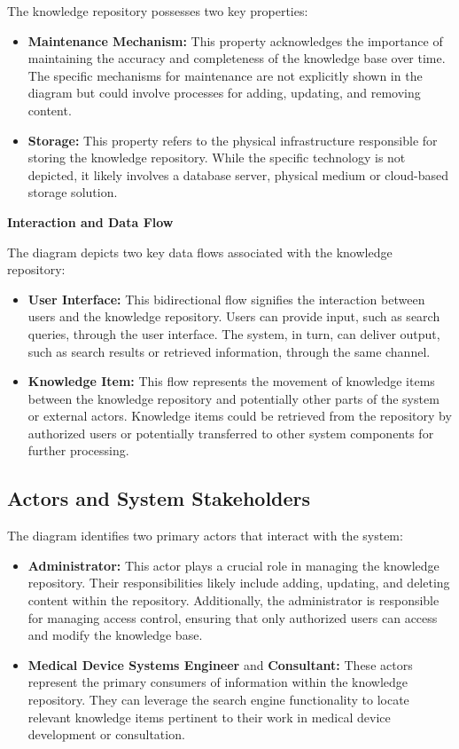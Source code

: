 \documentclass[
  letterpaper,
  DIV=11,
  numbers=noendperiod]{scrreprt}
\begin{document}
The knowledge repository possesses two key properties:

\begin{itemize}
\item
  \textbf{Maintenance Mechanism:} This property acknowledges the
  importance of maintaining the accuracy and completeness of the
  knowledge base over time. The specific mechanisms for maintenance are
  not explicitly shown in the diagram but could involve processes for
  adding, updating, and removing content.
\item
  \textbf{Storage:} This property refers to the physical infrastructure
  responsible for storing the knowledge repository. While the specific
  technology is not depicted, it likely involves a database server,
  physical medium or cloud-based storage solution.
\end{itemize}

\textbf{Interaction and Data Flow}

The diagram depicts two key data flows associated with the knowledge
repository:

\begin{itemize}
\item
  \textbf{User Interface:} This bidirectional flow signifies the
  interaction between users and the knowledge repository. Users can
  provide input, such as search queries, through the user interface. The
  system, in turn, can deliver output, such as search results or
  retrieved information, through the same channel.
\item
  \textbf{Knowledge Item:} This flow represents the movement of
  knowledge items between the knowledge repository and potentially other
  parts of the system or external actors. Knowledge items could be
  retrieved from the repository by authorized users or potentially
  transferred to other system components for further processing.
\end{itemize}

\subsection{Actors and System
Stakeholders}\label{actors-and-system-stakeholders}

The diagram identifies two primary actors that interact with the system:

\begin{itemize}
\item
  \textbf{Administrator:} This actor plays a crucial role in managing
  the knowledge repository. Their responsibilities likely include
  adding, updating, and deleting content within the repository.
  Additionally, the administrator is responsible for managing access
  control, ensuring that only authorized users can access and modify the
  knowledge base.
\item
  \textbf{Medical Device Systems Engineer} and \textbf{Consultant:}
  These actors represent the primary consumers of information within the
  knowledge repository. They can leverage the search engine
  functionality to locate relevant knowledge items pertinent to their
  work in medical device development or consultation.
\end{itemize}
\end{document}
